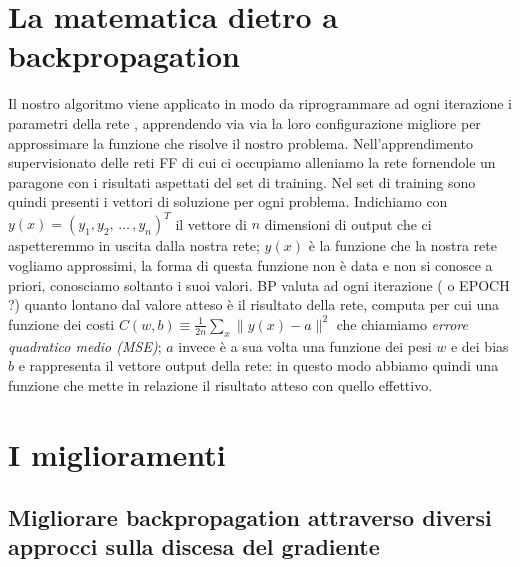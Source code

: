 \section*{La matematica dietro a backpropagation}
Il nostro algoritmo viene applicato in modo da riprogrammare ad ogni iterazione i parametri della rete , apprendendo via via la loro configurazione migliore per approssimare la funzione che risolve il nostro problema. Nell'apprendimento supervisionato delle reti FF di cui ci occupiamo alleniamo la rete fornendole un paragone con i risultati aspettati del set di training. Nel set di training sono quindi presenti i vettori di soluzione per ogni problema. Indichiamo con $ y(x)=(y_{1}, y_{2},\, \dots \, , y_{n})^{T} $ il vettore di $n$ dimensioni di output che ci aspetteremmo in uscita dalla  nostra rete; $y(x)$ è la funzione che la nostra rete vogliamo approssimi, la forma di questa funzione non è data e non si conosce a priori, conosciamo soltanto i suoi valori. BP valuta ad ogni iterazione ( o EPOCH ?) quanto lontano dal valore atteso è il risultato della rete, computa per cui una funzione dei costi $\displaystyle C(w,b)\equiv\frac{1}{2n}\sum_{x} \parallel y(x)-a\parallel^{2}$ che chiamiamo \textit{errore quadratico medio (MSE)}; $a$ invece è a sua volta una funzione dei pesi $w$ e dei bias $b$ e rappresenta il vettore output della rete: in questo modo abbiamo quindi una funzione che mette in relazione il risultato atteso con quello effettivo.
 
\section*{I miglioramenti}
\subsection*{Migliorare backpropagation attraverso diversi approcci sulla discesa del gradiente}

